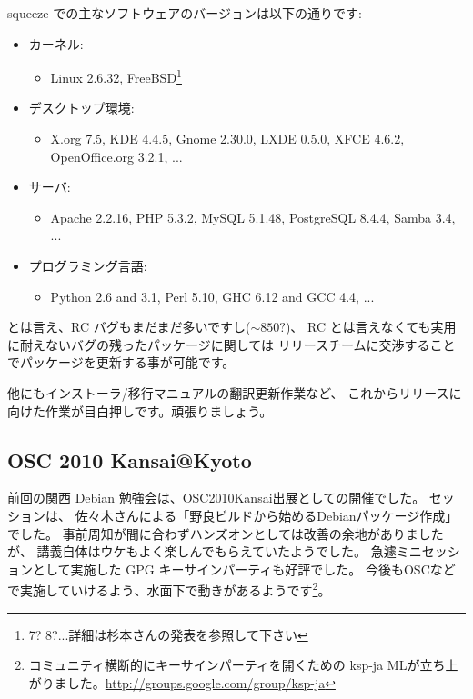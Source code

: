 \documentclass[mingoth,a4paper]{jsarticle}
\begin{document}
squeeze での主なソフトウェアのバージョンは以下の通りです:
\begin{itemize}
      \item カーネル:
    \begin{itemize}
          \item Linux 2.6.32, 
        FreeBSD\footnote{7? 8?...詳細は杉本さんの発表を参照して下さい}
    \end{itemize}
      \item 
    デスクトップ環境:
    \begin{itemize}
          \item 
        X.org 7.5, KDE 4.4.5, Gnome 2.30.0, LXDE 0.5.0,  XFCE 4.6.2, 
        OpenOffice.org 3.2.1, ...
    \end{itemize}
      \item
    サーバ:
    \begin{itemize}
          \item 
        Apache 2.2.16, PHP 5.3.2, MySQL 5.1.48, PostgreSQL 8.4.4, Samba 3.4, 
        ...
    \end{itemize}
      \item
    プログラミング言語:
    \begin{itemize}
          \item Python 2.6 and 3.1, Perl 5.10, GHC 6.12 and GCC 4.4, ...
    \end{itemize}
\end{itemize}

とは言え、RC バグもまだまだ多いですし($\sim 850?$)、
RC とは言えなくても実用に耐えないバグの残ったパッケージに関しては
リリースチームに交渉することでパッケージを更新する事が可能です。

他にもインストーラ/移行マニュアルの翻訳更新作業など、
これからリリースに向けた作業が目白押しです。頑張りましょう。

\subsection{OSC 2010 Kansai@Kyoto}

前回の関西 Debian 勉強会は、OSC2010Kansai出展としての開催でした。
セッションは、
佐々木さんによる「野良ビルドから始めるDebianパッケージ作成」でした。
事前周知が間に合わずハンズオンとしては改善の余地がありましたが、
講義自体はウケもよく楽しんでもらえていたようでした。
%
急遽ミニセッションとして実施した GPG キーサインパーティも好評でした。
今後もOSCなどで実施していけるよう、水面下で動きがあるようです\footnote{%
コミュニティ横断的にキーサインパーティを開くための
ksp-ja MLが立ち上がりました。\url{http://groups.google.com/group/ksp-ja}}。
\end{document}
